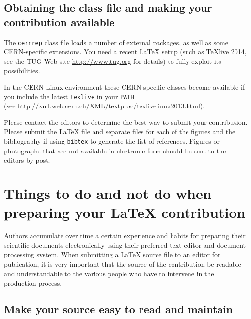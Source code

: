 \documentclass{cernrep}
\begin{document}
\subsection{Obtaining the class file and making your contribution available}

The \texttt{cernrep} class file loads a number of external packages,
as well as some CERN-specific extensions. You need a recent \LaTeX{}
setup (such as \TeX{}live 2014, see the TUG Web site
\url{http://www.tug.org} for details) to fully exploit its
possibilities. 

In the CERN Linux environment these CERN-specific classes become
available if you include the latest \texttt{texlive} in your
\texttt{PATH} \\(see \url{http://xml.web.cern.ch/XML/textproc/texlivelinux2013.html}). 

Please contact the editors to determine the best way to submit your
contribution. Please submit the \LaTeX{} file and separate files for
each of the figures and the bibliography if using \verb|bibtex| to
generate the list of references.  Figures or photographs that are not
available in electronic form should be sent to the editors by post.

\newpage
\section{Things to do and not do when preparing your \LaTeX{}
  contribution}
\label{app:donotdo}

Authors accumulate over time a certain experience and habits for
preparing their scientific documents electronically using their
preferred text editor and document processing system. When submitting
a \LaTeX{} source file to an editor for publication, it is very
important that the source of the contribution be readable and
understandable to the various people who have to intervene in the
production process.

\subsection{Make your source easy to read and maintain}
\end{document}
